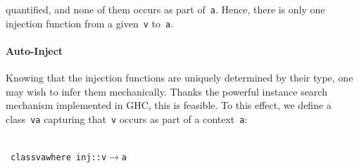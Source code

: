 \documentclass[9pt,preprint,authoryear]{sigplanconf}
\begin{document}
    quantified, and none of them occurs as part of{~}\textcolor[rgb]{0,0,0.80}{\texttt{a}}. Hence, there
    is only one injection function from a given{~}\textcolor[rgb]{0,0,0.80}{\texttt{v}} to{~}\textcolor[rgb]{0,0,0.80}{\texttt{a}}.%


\paragraph*{Auto-Inject}

%
Knowing that the injection functions are uniquely determined by
    their type, one may wish to infer them mechanically. Thanks 
    the powerful instance search mechanism implemented in GHC, this
    is feasible. To this effect, we define a class{~}\textcolor[rgb]{0,0,0.80}{\texttt{v}}\textcolor[rgb]{0,0,0.80}{\texttt{\mbox{\hspace{0.50em}}}}\textcolor[rgb]{0,0,0.80}{\texttt{\makebox[1.22ex][c]{$ \in $}}}\textcolor[rgb]{0,0,0.80}{\texttt{\mbox{\hspace{0.50em}}}}\textcolor[rgb]{0,0,0.80}{\texttt{a}} capturing that{~}\textcolor[rgb]{0,0,0.80}{\texttt{v}}    occurs as part of a context{~}\textcolor[rgb]{0,0,0.80}{\texttt{a}}{:}%


{\nopagebreak }

%
%
%
~\\~\vphantom{$\{$}\textcolor[cmyk]{0,0.65,0.99,0}{\texttt{class}}\textcolor[rgb]{0,0,0.80}{\texttt{\mbox{\hspace{0.50em}}}}\textcolor[rgb]{0,0,0.80}{\texttt{v}}\textcolor[rgb]{0,0,0.80}{\texttt{\mbox{\hspace{0.50em}}}}\textcolor[rgb]{0,0,0.80}{\texttt{\makebox[1.22ex][c]{$ \in $}}}\textcolor[rgb]{0,0,0.80}{\texttt{\mbox{\hspace{0.50em}}}}\textcolor[rgb]{0,0,0.80}{\texttt{a}}\textcolor[rgb]{0,0,0.80}{\texttt{\mbox{\hspace{0.50em}}}}\textcolor[cmyk]{0,0.65,0.99,0}{\texttt{where}}\textcolor[rgb]{0,0,0.80}{\texttt{{\nopagebreak \newline%
}\vphantom{$\{$}}}\textcolor[rgb]{0,0,0.80}{\texttt{\mbox{\hspace{0.50em}}}}\textcolor[rgb]{0,0,0.80}{\texttt{\mbox{\hspace{0.50em}}}}\textcolor[rgb]{0,0,0.80}{\texttt{inj}}\textcolor[rgb]{0,0,0.80}{\texttt{\mbox{\hspace{0.50em}}}}\textcolor[cmyk]{0,0.65,0.99,0}{\texttt{{:}{:}}}\textcolor[rgb]{0,0,0.80}{\texttt{\mbox{\hspace{0.50em}}}}\textcolor[rgb]{0,0,0.80}{\texttt{v}}\textcolor[rgb]{0,0,0.80}{\texttt{\mbox{\hspace{0.50em}}}}\textcolor[cmyk]{0,0.65,0.99,0}{\texttt{$ \rightarrow $}}\textcolor[rgb]{0,0,0.80}{\texttt{\mbox{\hspace{0.50em}}}}\textcolor[rgb]{0,0,0.80}{\texttt{a}}\textcolor[rgb]{0,0,0.80}{\texttt{{\nopagebreak \newline%
}\vphantom{$\{$}}}%
\end{document}
